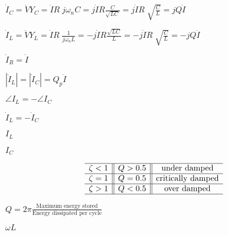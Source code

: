 \documentclass{article}
\def\lthtmlcheckvsize{\ifdim\ht\sizebox<\vsize 
  \ifdim\wd\sizebox<\hsize\expandafter\hfill\fi \expandafter\vfill
  \else\expandafter\vss\fi}%
\begin{document}
{\newpage\clearpage
{}%
$\displaystyle \dot{I}_C=\dot{V} Y_C=\dot{I}R\;j\omega_n C=j\dot{I}R\frac{C}{\sqrt{LC}}
=j \dot{I} R\;\sqrt{\frac{C}{L}}=jQ\dot{I}$%
\lthtmlindisplaymathZ
\lthtmlcheckvsize\clearpage}

{\newpage\clearpage
{}%
$\displaystyle \dot{I}_L=\dot{V} Y_L=\dot{I}R\;\frac{1}{j\omega_n L}
=-j\dot{I}R\frac{\sqrt{LC}}{L}=-j \dot{I} R\;\sqrt{\frac{C}{L}}=-jQ\dot{I}$%
\lthtmlindisplaymathZ
\lthtmlcheckvsize\clearpage}

{\newpage\clearpage
{}%
$ \dot{I}_R=\dot{I}$%
\lthtmlindisplaymathZ
\lthtmlcheckvsize\clearpage}

{\newpage\clearpage
{}%
$ |\dot{I}_L|=|\dot{I}_C|=Q_p\dot{I}$%
\lthtmlindisplaymathZ
\lthtmlcheckvsize\clearpage}

{\newpage\clearpage
{}%
$ \angle I_L=-\angle I_C$%
\lthtmlindisplaymathZ
\lthtmlcheckvsize\clearpage}

{\newpage\clearpage
{}%
$ \dot{I}_L=-\dot{I}_C$%
\lthtmlindisplaymathZ
\lthtmlcheckvsize\clearpage}

{\newpage\clearpage
{}%
$ I_L$%
\lthtmlindisplaymathZ
\lthtmlcheckvsize\clearpage}

{\newpage\clearpage
{}%
$ I_C$%
\lthtmlindisplaymathZ
\lthtmlcheckvsize\clearpage}

{\newpage\clearpage
{}%
\begin{displaymath}\begin{array}{c||c||c} \hline
\zeta<1 & Q>0.5 & \mbox{under damped} \\\hline
\zeta=1 & Q=0.5 & \mbox{critically damped} \\\hline
\zeta>1 & Q<0.5 & \mbox{over damped} \\\hline
\end{array}\end{displaymath}%
\lthtmldisplayZ
\lthtmlcheckvsize\clearpage}

{\newpage\clearpage
{}%
$\displaystyle Q=2\pi\frac{\mbox{Maximum energy stored}}{\mbox{Energy dissipated per cycle}}$%
\lthtmlindisplaymathZ
\lthtmlcheckvsize\clearpage}

{\newpage\clearpage
{}%
$ \omega L$%
\lthtmlindisplaymathZ
\lthtmlcheckvsize\clearpage}
\end{document}

